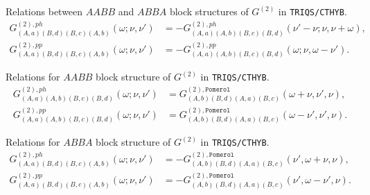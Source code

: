 \documentclass[a4paper,12pt]{article}
\newcommand{\w}{\ensuremath{\omega}}
\newcommand{\n}{\ensuremath{\nu}}
\newcommand{\pom}{\ensuremath{\mathtt{Pomerol}}}
\begin{document}
Relations between $AABB$ and $ABBA$ block structures of $G^{(2)}$  in
\texttt{TRIQS/CTHYB}.
\begin{align}
G^{(2),ph}_{(A,a)(B,d)(B,c)(A,b)}(\w;\n,\n') &= -
G^{(2),ph}_{(A,a)(A,b)(B,c)(B,d)}(\n'-\n;\n,\n+\w),\\
G^{(2),pp}_{(A,a)(B,d)(B,c)(A,b)}(\w;\n,\n') &= -
G^{(2),pp}_{(A,a)(A,b)(B,c)(B,d)}(\w;\n,\w-\n').
\end{align}

Relations for $AABB$ block structure of $G^{(2)}$ in \texttt{TRIQS/CTHYB}.
\begin{align}
	G^{(2),ph}_{(A,a)(A,b)(B,c)(B,d)}(\w;\n,\n') &=
	G^{(2),\pom}_{(A,b)(B,d)(A,a)(B,c)}(\w+\n,\n',\n),\\
	G^{(2),pp}_{(A,a)(A,b)(B,c)(B,d)}(\w;\n,\n') &=
	G^{(2),\pom}_{(A,b)(B,d)(A,a)(B,c)}(\w-\n',\n',\n).
\end{align}

Relations for $ABBA$ block structure of $G^{(2)}$ in \texttt{TRIQS/CTHYB}.
\begin{align}
	G^{(2),ph}_{(A,a)(B,d)(B,c)(A,b)}(\w;\n,\n') &= -
	G^{(2),\pom}_{(A,b)(B,d)(A,a)(B,c)}(\n',\w+\n,\n),\\
	G^{(2),pp}_{(A,a)(B,d)(B,c)(A,b)}(\w;\n,\n') &= -
	G^{(2),\pom}_{(A,b)(B,d)(A,a)(B,c)}(\n',\w-\n',\n).
\end{align}
\end{document}
